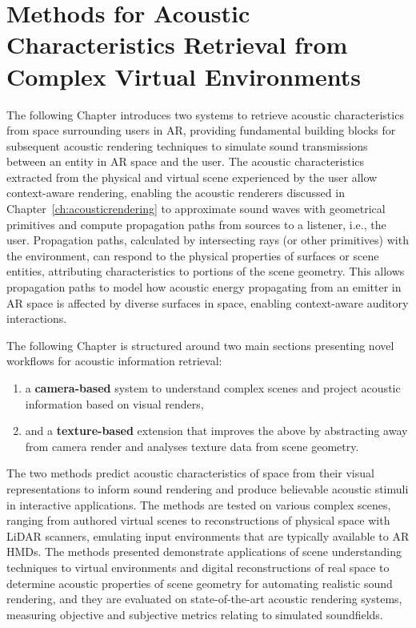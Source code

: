 \chapter{Methods for Acoustic Characteristics Retrieval from Complex Virtual Environments} %
\label{ch:Materials}
The following Chapter introduces two systems to retrieve acoustic characteristics from space surrounding users in AR, providing fundamental building blocks for subsequent acoustic rendering techniques to simulate sound transmissions between an entity in AR space and the user. The acoustic characteristics extracted from the physical and virtual scene experienced by the user allow context-aware rendering, enabling the acoustic renderers discussed in Chapter~\ref{ch:acousticrendering} to approximate sound waves with geometrical primitives and compute propagation paths from sources to a listener, i.e., the user. Propagation paths, calculated by intersecting rays (or other primitives) with the environment, can respond to the physical properties of surfaces or scene entities, attributing characteristics to portions of the scene geometry. This allows propagation paths to model how acoustic energy propagating from an emitter in AR space is affected by diverse surfaces in space, enabling context-aware auditory interactions.\par
The following Chapter is structured around two main sections presenting novel workflows for acoustic information retrieval:
\begin{enumerate}
    \item a \textbf{camera-based} system to understand complex scenes and project acoustic information based on visual renders,
    \item and a \textbf{texture-based} extension that improves the above by abstracting away from camera render and analyses texture data from scene geometry.
\end{enumerate}
The two methods predict acoustic characteristics of space from their visual representations to inform sound rendering and produce believable acoustic stimuli in interactive applications. The methods are tested on various complex scenes, ranging from authored virtual scenes to reconstructions of physical space with LiDAR scanners, emulating input environments that are typically available to AR HMDs. The methods presented demonstrate applications of scene understanding techniques to virtual environments and digital reconstructions of real space to determine acoustic properties of scene geometry for automating realistic sound rendering, and they are evaluated on state-of-the-art acoustic rendering systems, measuring objective and subjective metrics relating to simulated soundfields. \par

